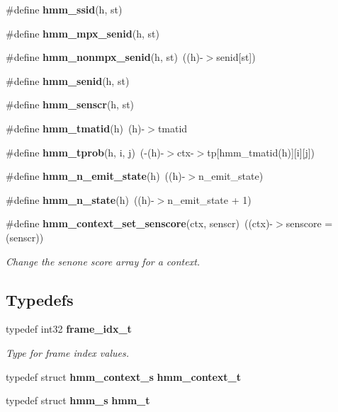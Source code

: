 \begin{DoxyCompactItemize}
\item 
\#define {\bfseries hmm\+\_\+ssid}(h,  st)
\item 
\#define {\bfseries hmm\+\_\+mpx\+\_\+senid}(h,  st)
\item 
\#define {\bfseries hmm\+\_\+nonmpx\+\_\+senid}(h,  st)~((h)-\/$>$senid[st])\label{hmm_8h_a45850600910ae0839f34792b00b5970b}

\item 
\#define {\bfseries hmm\+\_\+senid}(h,  st)
\item 
\#define {\bfseries hmm\+\_\+senscr}(h,  st)
\item 
\#define {\bfseries hmm\+\_\+tmatid}(h)~(h)-\/$>$tmatid\label{hmm_8h_a749193daefb4247e56dbc6b3f2d75c14}

\item 
\#define {\bfseries hmm\+\_\+tprob}(h,  i,  j)~(-\/(h)-\/$>$ctx-\/$>$tp[hmm\+\_\+tmatid(h)][i][j])\label{hmm_8h_a3d6e71af2d2ce897e63a5ee8c5741593}

\item 
\#define {\bfseries hmm\+\_\+n\+\_\+emit\+\_\+state}(h)~((h)-\/$>$n\+\_\+emit\+\_\+state)\label{hmm_8h_a4ef324f17daafd4de126b88671c7e93c}

\item 
\#define {\bfseries hmm\+\_\+n\+\_\+state}(h)~((h)-\/$>$n\+\_\+emit\+\_\+state + 1)\label{hmm_8h_a16311c1d64310ad3a8af33eec0fbe9f1}

\item 
\#define {\bf hmm\+\_\+context\+\_\+set\+\_\+senscore}(ctx,  senscr)~((ctx)-\/$>$senscore = (senscr))\label{hmm_8h_a44d0b5515cb269bf9b95f62aada18cbb}

\begin{DoxyCompactList}\small\item\em Change the senone score array for a context. \end{DoxyCompactList}\end{DoxyCompactItemize}
\subsection*{Typedefs}
\begin{DoxyCompactItemize}
\item 
typedef int32 {\bf frame\+\_\+idx\+\_\+t}
\begin{DoxyCompactList}\small\item\em Type for frame index values. \end{DoxyCompactList}\item 
typedef struct {\bf hmm\+\_\+context\+\_\+s} {\bfseries hmm\+\_\+context\+\_\+t}\label{hmm_8h_a87dd8e0478af63326664232541d2ade6}

\item 
typedef struct {\bf hmm\+\_\+s} {\bfseries hmm\+\_\+t}\label{hmm_8h_a6f69b65f5fd63aa882fbe6002be74c13}

\end{DoxyCompactItemize}
